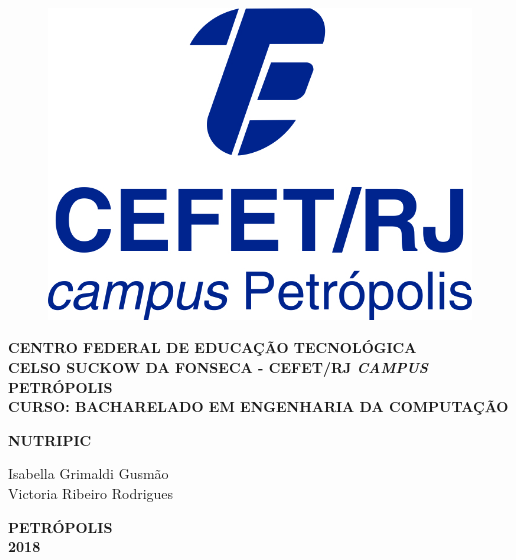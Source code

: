 \begin{figure}
\center
\includegraphics[height=0.15\textwidth]{Figs/logoCefetCampusPetropolis.jpg} 
\end{figure}


\vspace*{0.8cm}

\begin{center}
{\large \bf CENTRO FEDERAL DE EDUCAÇÃO TECNOLÓGICA} \vspace{1mm} \\
{\large \bf CELSO SUCKOW DA FONSECA - CEFET/RJ \textit{CAMPUS} PETRÓPOLIS} \vspace{1mm} \\
{\large \bf CURSO: BACHARELADO EM ENGENHARIA DA COMPUTAÇÃO}

\vspace*{5cm}
{\large \bf NUTRIPIC}\\
\end{center}
\vspace{4cm}
\hfill
	\begin{flushright}
	Isabella Grimaldi Gusmão \\
	Victoria Ribeiro Rodrigues
	\end{flushright}


\vspace*{3.3cm}
\begin{center}
{\bf PETRÓPOLIS \\ 2018}\\
\end{center}

\newpage
\pagestyle{empty}

